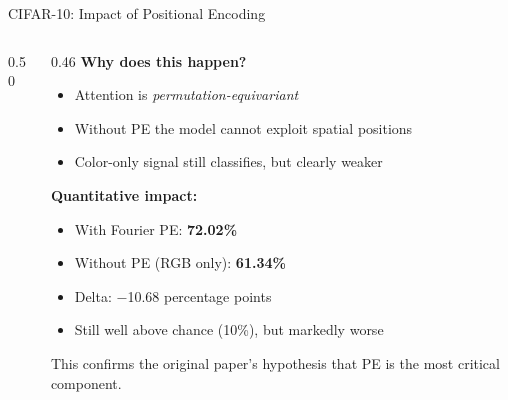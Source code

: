 \documentclass[aspectratio=169,11pt]{beamer}
\begin{document}
\begin{frame}[shrink=12]{CIFAR-10: Impact of Positional Encoding}
  \begin{columns}[T]
    \begin{column}{0.50\textwidth}
      \begin{center}
      \end{center}
    \end{column}
    \begin{column}{0.46\textwidth}
      \textbf{Why does this happen?}
      \begin{itemize}
        \item Attention is \textit{permutation-equivariant}
        \item Without PE the model cannot exploit spatial positions
        \item Color-only signal still classifies, but clearly weaker
      \end{itemize}

      \vspace{0.5em}
      \textbf{Quantitative impact:}
      \begin{itemize}
        \item With Fourier PE: \textbf{72.02\%}
        \item Without PE (RGB only): \textbf{61.34\%}
        \item Delta: \alert{$-$10.68 percentage points}
        \item Still well above chance (10\%), but markedly worse
      \end{itemize}

      \vspace{0.3em}
      This confirms the original paper's hypothesis that PE is the most critical component.
    \end{column}
  \end{columns}
\end{frame}
\end{document}
